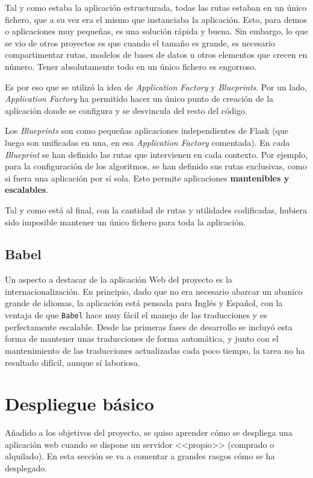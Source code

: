 Tal y como estaba la aplicación estructurada, todas las rutas estaban en un
único fichero, que a su vez era el mismo que instanciaba la aplicación. Esto,
para demos o aplicaciones muy pequeñas, es una solución rápida y buena. Sin
embargo, lo que se vio de otros proyectos es que cuando el tamaño es grande, es
necesario compartimentar rutas, modelos de bases de datos u otros elementos que
crecen en número. Tener absolutamente todo en un único fichero es engorroso.

Es por eso que se utilizó la idea de \textit{Application Factory} y
\textit{Blueprints}. Por un lado, \textit{Application Factory} ha permitido
hacer un único punto de creación de la aplicación donde se configura y se
desvincula del resto del código.

Los \textit{Blueprints} son como pequeñas aplicaciones independientes de Flask
(que luego son unificadas en una, en esa \textit{Application Factory}
comentada). En cada \textit{Blueprint} se han definido las rutas que intervienen
en cada contexto. Por ejemplo, para la configuración de los algoritmos, se han
definido sus rutas exclusivas, como si fuera una aplicación por sí sola. Esto
permite aplicaciones \textbf{mantenibles y escalables}.

Tal y como está al final, con la cantidad de rutas y utilidades codificadas,
hubiera sido imposible mantener un único fichero para toda la aplicación.

\subsection{Babel}

Un aspecto a destacar de la aplicación Web del proyecto es la
internacionalización. En principio, dado que no era necesario abarcar un abanico
grande de idiomas, la aplicación está pensada para Inglés y Español, con la
ventaja de que \texttt{Babel} hace muy fácil el manejo de las traducciones y es
perfectamente escalable. Desde las primeras fases de desarrollo se incluyó esta
forma de mantener unas traducciones de forma automática, y junto con el
mantenimiento de las traducciones actualizadas cada poco tiempo, la tarea no ha
resultado difícil, aunque sí laboriosa.

\section{Despliegue básico}

Añadido a los objetivos del proyecto, se quiso aprender cómo se despliega una
aplicación web cuando se dispone un servidor <<propio>> (comprado o alquilado).
En esta sección se va a comentar a grandes rasgos cómo se ha desplegado.

